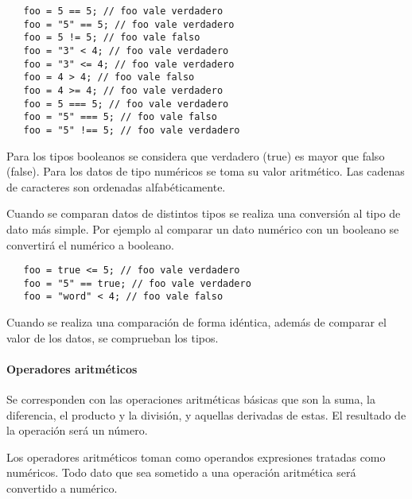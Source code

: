 \begin{lstlisting}
   foo = 5 == 5; // foo vale verdadero
   foo = "5" == 5; // foo vale verdadero
   foo = 5 != 5; // foo vale falso
   foo = "3" < 4; // foo vale verdadero
   foo = "3" <= 4; // foo vale verdadero
   foo = 4 > 4; // foo vale falso
   foo = 4 >= 4; // foo vale verdadero
   foo = 5 === 5; // foo vale verdadero
   foo = "5" === 5; // foo vale falso
   foo = "5" !== 5; // foo vale verdadero
\end{lstlisting} 

Para los tipos booleanos se considera que verdadero (true) es mayor que falso (false). Para los datos de tipo numéricos se toma su valor aritmético.
Las cadenas de caracteres son ordenadas alfabéticamente.

Cuando se comparan datos de distintos tipos se realiza una conversión al tipo de dato más simple. Por ejemplo al comparar un dato numérico con un booleano se convertirá
el numérico a booleano. \\

\begin{lstlisting}
   foo = true <= 5; // foo vale verdadero
   foo = "5" == true; // foo vale verdadero
   foo = "word" < 4; // foo vale falso
\end{lstlisting} 

Cuando se realiza una comparación de forma idéntica, además de comparar el valor de los datos, se comprueban los tipos.



\paragraph{Operadores aritméticos} \label{sec:op_arth}

Se corresponden con las operaciones aritméticas básicas que son la suma, la diferencia, el producto y la división, y 
aquellas derivadas de estas. El resultado de la operación será un número.

Los operadores aritméticos toman como operandos expresiones tratadas como numéricos. Todo dato que sea sometido a una operación
aritmética será convertido a numérico.

